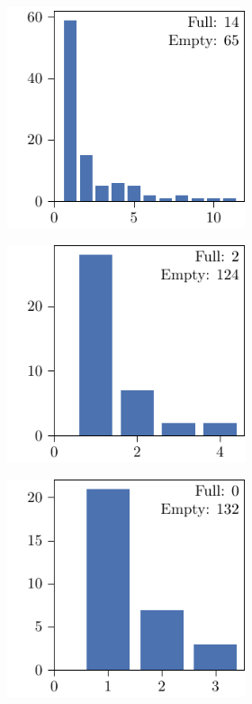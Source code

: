 \begin{figure}[p]
  \centering
  \begin{subfigure}{\textwidth}
    \centering
    \begin{subfigure}{\mymultiouter}
        \includegraphics[width=\mymultiinner]{figures/new/abs_common-princess-qlibra-permutation}
    \end{subfigure}
    \begin{subfigure}{\mymultiouter}
        \includegraphics[width=\mymultiinner]{figures/new/abs_common-princess-qlibra-retraining}
    \end{subfigure}
    \begin{subfigure}{\mymultiouter}
        \includegraphics[width=\mymultiinner]{figures/new/abs_common-princess-permutation-retraining}

\end{subfigure}
\end{subfigure}
\end{figure}
